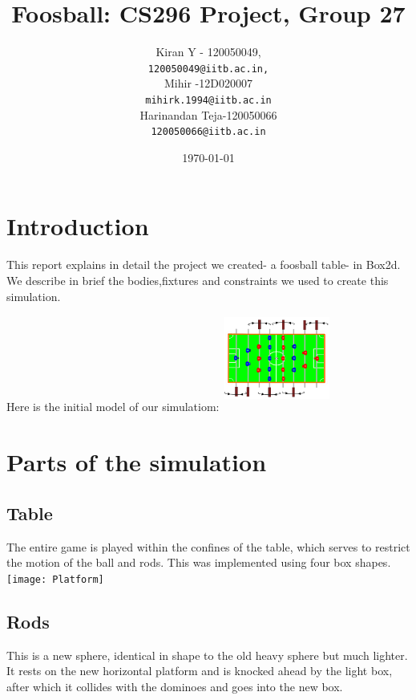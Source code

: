 \documentclass{article}
\begin{document}
\title{Foosball: CS296 Project, Group 27}

\author{
Kiran Y - 120050049,\\
\texttt{120050049@iitb.ac.in,}\\
Mihir -12D020007\\
\texttt{mihirk.1994@iitb.ac.in}\\
Harinandan Teja-120050066\\
\texttt{120050066@iitb.ac.in}\\
}
\date{\today}

\maketitle

\section{Introduction}
This report explains in detail the project we created- a foosball table- in Box2d. We describe in brief the bodies,fixtures and constraints we used to create this simulation.\\
Here is the initial model of our simulatiom:
\includegraphics[width=100pt,height=100pt]{foosball}
\section{Parts of the simulation}

\subsection{Table}
The entire game is played within the confines of the table, which serves to restrict the motion of the ball and rods. This was implemented using four box shapes.\\
\texttt{[image: Platform]}

\subsection{Rods}
This is a new sphere, identical in shape to the old heavy sphere but much lighter. It rests on the new horizontal platform and is knocked ahead by the light box, after which it collides with the dominoes and goes into the new box.\\
\end{document}
